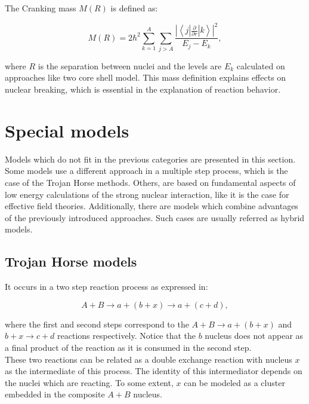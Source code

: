 \documentclass[openany]{book}
\begin{document}
The Cranking mass $M(R)$ is defined as: 

\begin{equation}\label{potential_crankingMass}
	M(R) = 2 \hbar^2 \sum_{k=1}^{A} \sum_{j > A} \frac{\left|\left \langle j | \frac{\partial}{\partial r} | k \right \rangle \right|^2}{E_j - E_k},
\end{equation}

where $R$ is the separation between nuclei and the levels are $E_k$ calculated on approaches like two core shell model. This mass definition explains effects on nuclear breaking, which is essential in the explanation of reaction behavior.


\section{Special models} \label{sec:specialModels}

Models which do not fit in the previous categories are presented in this section. Some models use a different approach in a multiple step process, which is the case of the Trojan Horse methods. Others, are based on fundamental aspects of low energy calculations of the strong nuclear interaction, like it is the case for effective field theories. Additionally, there are models which combine advantages of the previously introduced approaches. Such cases are usually referred as hybrid models.

\subsection{Trojan Horse models} \label{sub:special_trojanHorse}

It occurs in a two step reaction process as expressed in:

\begin{equation}\label{eq: special_trojanHorse_reaction}
	A + B \rightarrow a + (b + x)\rightarrow a + (c + d),
\end{equation}

where the first and second steps correspond to the $A + B \rightarrow a + (b + x)$ and $b + x \rightarrow c + d$ reactions respectively. Notice that the $b$ nucleus does not appear as a final product of the reaction as it is consumed in the second step. \\

These two reactions can be related as a double exchange reaction with nucleus $x$ as the intermediate of this process. The identity of this intermediator depends on the nuclei which are reacting. To some extent, $x$ can be modeled as a cluster embedded in the composite $A + B$ nucleus. \\ 
\end{document}
